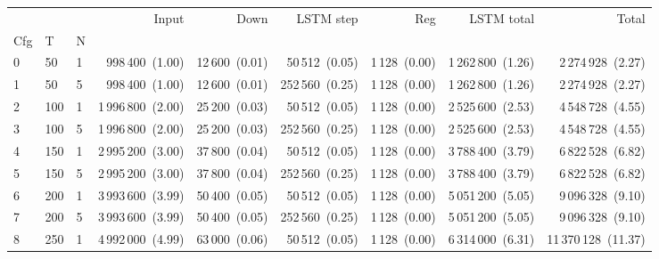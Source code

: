 \begin{tabular}{lllrrrrrr}
\toprule
 &  &  & Input & Down & LSTM step & Reg & LSTM total & Total \\
Cfg & T & N &  &  &  &  &  &  \\
\midrule
0 & 50 & 1 & 998\,400~{\footnotesize(1.00)} & 12\,600~{\footnotesize(0.01)} & 50\,512~{\footnotesize(0.05)} & 1\,128~{\footnotesize(0.00)} & 1\,262\,800~{\footnotesize(1.26)} & 2\,274\,928~{\footnotesize(2.27)} \\
\cline{1-9} \cline{2-9}
1 & 50 & 5 & 998\,400~{\footnotesize(1.00)} & 12\,600~{\footnotesize(0.01)} & 252\,560~{\footnotesize(0.25)} & 1\,128~{\footnotesize(0.00)} & 1\,262\,800~{\footnotesize(1.26)} & 2\,274\,928~{\footnotesize(2.27)} \\
\cline{1-9} \cline{2-9}
2 & 100 & 1 & 1\,996\,800~{\footnotesize(2.00)} & 25\,200~{\footnotesize(0.03)} & 50\,512~{\footnotesize(0.05)} & 1\,128~{\footnotesize(0.00)} & 2\,525\,600~{\footnotesize(2.53)} & 4\,548\,728~{\footnotesize(4.55)} \\
\cline{1-9} \cline{2-9}
3 & 100 & 5 & 1\,996\,800~{\footnotesize(2.00)} & 25\,200~{\footnotesize(0.03)} & 252\,560~{\footnotesize(0.25)} & 1\,128~{\footnotesize(0.00)} & 2\,525\,600~{\footnotesize(2.53)} & 4\,548\,728~{\footnotesize(4.55)} \\
\cline{1-9} \cline{2-9}
4 & 150 & 1 & 2\,995\,200~{\footnotesize(3.00)} & 37\,800~{\footnotesize(0.04)} & 50\,512~{\footnotesize(0.05)} & 1\,128~{\footnotesize(0.00)} & 3\,788\,400~{\footnotesize(3.79)} & 6\,822\,528~{\footnotesize(6.82)} \\
\cline{1-9} \cline{2-9}
5 & 150 & 5 & 2\,995\,200~{\footnotesize(3.00)} & 37\,800~{\footnotesize(0.04)} & 252\,560~{\footnotesize(0.25)} & 1\,128~{\footnotesize(0.00)} & 3\,788\,400~{\footnotesize(3.79)} & 6\,822\,528~{\footnotesize(6.82)} \\
\cline{1-9} \cline{2-9}
6 & 200 & 1 & 3\,993\,600~{\footnotesize(3.99)} & 50\,400~{\footnotesize(0.05)} & 50\,512~{\footnotesize(0.05)} & 1\,128~{\footnotesize(0.00)} & 5\,051\,200~{\footnotesize(5.05)} & 9\,096\,328~{\footnotesize(9.10)} \\
\cline{1-9} \cline{2-9}
7 & 200 & 5 & 3\,993\,600~{\footnotesize(3.99)} & 50\,400~{\footnotesize(0.05)} & 252\,560~{\footnotesize(0.25)} & 1\,128~{\footnotesize(0.00)} & 5\,051\,200~{\footnotesize(5.05)} & 9\,096\,328~{\footnotesize(9.10)} \\
\cline{1-9} \cline{2-9}
8 & 250 & 1 & 4\,992\,000~{\footnotesize(4.99)} & 63\,000~{\footnotesize(0.06)} & 50\,512~{\footnotesize(0.05)} & 1\,128~{\footnotesize(0.00)} & 6\,314\,000~{\footnotesize(6.31)} & 11\,370\,128~{\footnotesize(11.37)} \\

\end{tabular}
